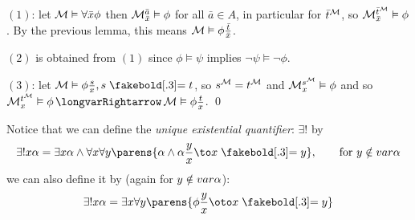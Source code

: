 \Proof $(1)$: let ${\cal M}\vDash\forall\bar x\phi$ then ${\cal M}^{\bar a}_{\bar x}\vDash\phi$ for all $\bar a\in A$, in particular for $\bar t^{{\cal M}}$, so ${\cal M}^{\bar t^{{\cal M}}}_{\bar x}\vDash\phi$.
By the previous lemma, this means ${\cal M}\vDash\phi{{\bar t}\over{\bar x}}$.

$(2)$ is obtained from $(1)$ since $\phi\vDash\psi$ implies $\neg\psi\vDash\neg\phi$.

$(3)$: let $\c M\vDash\phi\frac sx,s\eq t$, so $s^{{\cal M}}=t^{{\cal M}}$ and ${\cal M}^{s^{{\cal M}}}_x\vDash\phi$ and so $\c M^{t^{\c M}}_x\vDash\phi\implies\c M\vDash\phi\frac tx$.
\qed

Notice that we can define the {\it unique existential quantifier}: $\exists!$ by
$$ \exists!x\alpha = \exists x\alpha\land\forall x\forall y\parens{\alpha\land\alpha\frac yx\to x\eq y},\qquad \hbox{for $y\notin\var\alpha$} $$
we can also define it by (again for $y\notin{\sl var}\alpha$):
$$ \exists!x\alpha = \exists x\forall y\parens{\phi\frac yx\oto x\eq y} $$

